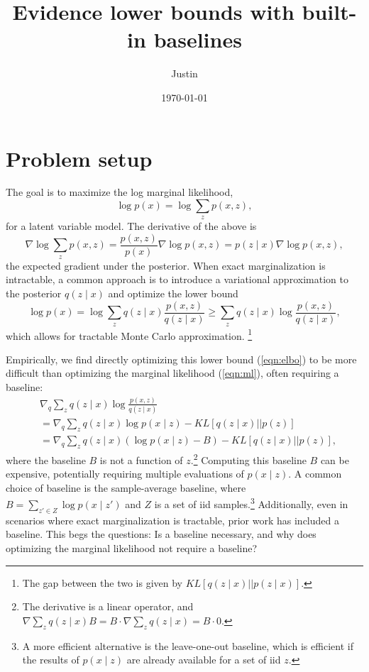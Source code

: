 \documentclass[12pt]{article}
\title{Evidence lower bounds with built-in baselines}
\author{Justin}
\date{\today}
\begin{document}
\maketitle

\section{Problem setup}
The goal is to maximize the log marginal likelihood,
\begin{equation}
\label{eqn:ml}
\log p(x) = \log \sum_z p(x,z),
\end{equation}
for a latent variable model.
The derivative of the above is 
\begin{equation}
\label{eqn:ml-grad}
\nabla \log \sum_z p(x,z)
= \frac{p(x,z)}{p(x)}\nabla \log p(x,z) = 
p(z\mid x)\nabla \log p(x,z),
\end{equation}
the expected gradient under the posterior.
When exact marginalization is intractable,
a common approach is to introduce a variational approximation to the posterior $q(z\mid x)$
and optimize the lower bound
\begin{equation}
\label{eqn:elbo}
\log p(x)
= \log \sum_z q(z\mid x) \frac{p(x,z)}{q(z\mid x)}
\ge \sum_z q(z\mid x) \log \frac{p(x,z)}{q(z\mid x)},
\end{equation}
which allows for tractable Monte Carlo approximation.
\footnote{
The gap between the two is given by $KL[q(z\mid x) || p(z \mid x)]$.
}

Empirically, we find directly optimizing this lower bound (\ref{eqn:elbo}) to be more difficult than
optimizing the marginal likelihood (\ref{eqn:ml}), often requiring a baseline:
\begin{equation}
\label{eqn:baseline}
\begin{aligned}
&\nabla_q \sum_z q(z\mid x) \log \frac{p(x,z)}{q(z\mid x)}\\
&= \nabla_q \sum_z q(z\mid x) \log p(x\mid z) - KL[q(z\mid x) || p(z)]\\
&= \nabla_q \sum_z q(z\mid x) (\log p(x\mid z) - B) - KL[q(z\mid x) || p(z)],
\end{aligned}
\end{equation}
where the baseline $B$ is not a function of $z$.\footnote{
The derivative is a linear operator, and
$\nabla\sum_z q(z\mid x)B = B\cdot\nabla \sum_z q(z\mid x) = B \cdot 0$.
}
Computing this baseline $B$ can be expensive,
potentially requiring multiple evaluations of $p(x\mid z)$.
A common choice of baseline is the sample-average baseline, where
$B = \sum_{z' \in Z} \log p(x\mid z')$
and $Z$ is a set of iid samples.\footnote{
A more efficient alternative is the leave-one-out baseline,
which is efficient if the results of $p(x\mid z)$ are already available
for a set of iid $z$.
}
Additionally, even in scenarios where exact marginalization is tractable,
prior work has included a baseline. This begs the questions:
Is a baseline necessary, and why does optimizing the marginal likelihood
not require a baseline?
\end{document}
